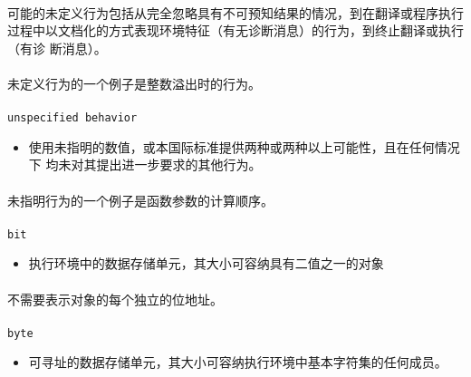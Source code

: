 \paragraph{}
\notes* 可能的未定义行为包括从完全忽略具有不可预知结果的情况，到在翻译或程序执行
过程中以文档化的方式表现环境特征（有无诊断消息）的行为，到终止翻译或执行（有诊
断消息）。

\paragraph{}
\ex* 未定义行为的一个例子是整数溢出时的行为。

\paragraph{}
\texttt{unspecified behavior}
\begin{itemize}
  \item[]{使用未指明的数值，或本国际标准提供两种或两种以上可能性，且在任何情况下
    均未对其提出进一步要求的其他行为。}
\end{itemize}

\paragraph{}
\ex* 未指明行为的一个例子是函数参数的计算顺序。

\paragraph{}
\texttt{bit}
\begin{itemize}
  \item[]{执行环境中的数据存储单元，其大小可容纳具有二值之一的对象}
\end{itemize}

\paragraph{}
\notes* 不需要表示对象的每个独立的位地址。

\paragraph{}
\texttt{byte}
\begin{itemize}
  \item[]{可寻址的数据存储单元，其大小可容纳执行环境中基本字符集的任何成员。}
\end{itemize}

